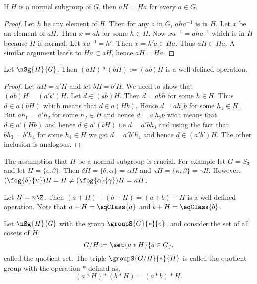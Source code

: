 \begin{Proposition}
    If $H$ is a normal subgroup of $G$, then $aH = Ha$ for every $a \in G$.
\end{Proposition}
\begin{proof}
    Let $h$ be any element of $H$. Then for any $a$ in $G$, $aha^{-1}$ is in $H$. Let $x$ be an element of
    $aH$. Then $x = ah$ for some $h \in H$. Now $xa^{-1} = aha^{-1}$ which is in $H$ because $H$ is normal.
    Let $xa^{-1} = h'$. Then $x = h'a \in Ha$. Thus $aH \subset Ha$. A similar argument leads to $Ha \subset
    aH$, hence $aH = Ha$.
\end{proof}
\begin{Proposition}
    Let $\nSg{H}{G}$. Then $(aH)\ast(bH) := (ab)H$ is a well defined operation.
\end{Proposition}
\begin{proof}
    Let $aH = a'H$ and let $bH = b'H$. We need to show that $(ab)H = (a'b')H$. Let $d \in (ab)H$. Then
    $d = abh$ for some $h \in H$. Thus $d \in a(bH)$ which means that $d \in a(Hb)$. Hence $d = ah_1b$ for some
    $h_1\in H$. But $ah_1 = a'h_2$ for some $h_2 \in H$ and hence $d = a'h_2b$ wich means that $d \in a'(Hb)$
    and hence $d \in a'(bH)$ i.e $d = a'bh_3$ and using the fact that $bh_3 = b'h_4$ for some $h_4 \in H$ we
    get $d = a'b'h_4$ and hence $d \in (a'b')H$. The other inclusion is analogous. 
\end{proof}
\begin{Example}
    The assumption that $H$ be a normal subgroup is crucial. For example let $G = S_3$ and let $H = \lbrace
    \epsilon,\beta\rbrace$. Then $\delta H = \lbrace \delta,\alpha \rbrace$ = $\alpha H$ and 
    $\kappa H = \lbrace \kappa, \beta \rbrace = \gamma H$.
    However, $(\fog{\delta}{\kappa})H = H \neq (\fog{\alpha}{\gamma})H = \kappa H$.
\end{Example}
\begin{Example}
    Let $H = n\Z$. Then $(a + H) + (b + H) = (a+b) + H$ is a well defined operation. Note that $a + H =
    \eqClass{a}$ and $b + H = \eqClass{b}$.
\end{Example}
\begin{Definition}[name=Quotient Group]
    Let $\nSg{H}{G}$ with the group $\groupS{G}{\ast}{e}$, and consider the set of all cosets of $H$,
    \[G/H :=\set{a \ast H}{a\in G},\]
    called the quotient set. 
    The triple $\groupS{G/H}{\ast}{H}$ is called the quotient group with the operation $\ast$ defined as,
    \[(a\ast H)\ast(b\ast H) = (a\ast b)\ast H.\]
\end{Definition}
